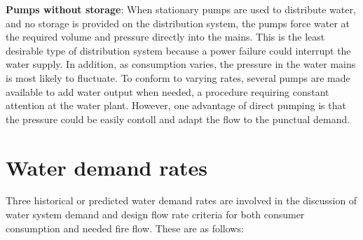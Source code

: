 \textbf{Pumps without storage}: When stationary pumps are used to distribute water, and no storage
is provided on the distribution system, the pumps force water at the required volume and pressure
directly into the mains. This is the least desirable type of distribution system because a power 
failure could interrupt the water supply. In addition, as consumption varies, the pressure in the
water mains is most likely to fluctuate. To conform to varying rates, several pumps are made 
available to add water output when needed, a procedure requiring constant attention at the water
plant. However, one advantage of direct pumping is that the pressure could be easily contoll 
and adapt the flow to the punctual demand.

\section{Water demand rates}
Three historical or predicted water demand rates are involved in the discussion of water system 
demand and design flow rate criteria for both consumer consumption and needed fire flow. These are as follows:

